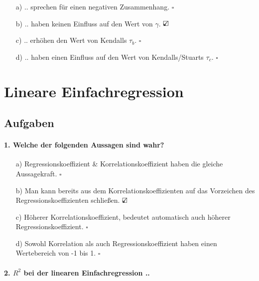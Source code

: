 \documentclass[a4paper]{article}
\begin{document}
\begin{itemize}
    \item[a)] .. sprechen für einen negativen Zusammenhang. \hfill $\square$
    \item[b)] .. haben keinen Einfluss auf den Wert von $\gamma$. \hfill $\text{\rlap{$\checkmark$}}\square$
    \item[c)] .. erhöhen den Wert von Kendalls $\tau_b$. \hfill $\square$
    \item[d)] .. haben einen Einfluss auf den Wert von Kendalls/Stuarts $\tau_c$. \hfill $\square$
\end{itemize}


\clearpage


\section{Lineare Einfachregression}\label{chap:linreg}

\subsection{Aufgaben}

\paragraph{1. Welche der folgenden Aussagen sind wahr?}

\begin{itemize}
    \item[a)] Regressionskoeffizient \& Korrelationskoeffizient haben die gleiche Aussagekraft. \hfill $\square$
    \item[b)] Man kann bereits aus dem Korrelationskoeffizienten auf das Vorzeichen des\\Regressionskoeffizienten schließen. \hfill $\text{\rlap{$\checkmark$}}\square$
    \item[c)] Höherer Korrelationskoeffizient, bedeutet automatisch auch höherer\\Regressionskoeffizient. \hfill $\square$
    \item[d)] Sowohl Korrelation als auch Regressionskoeffizient haben einen Wertebereich von -1 bis 1. \hfill $\square$
\end{itemize}

\paragraph{2. $R^2$ bei der linearen Einfachregression ..}
\end{document}
